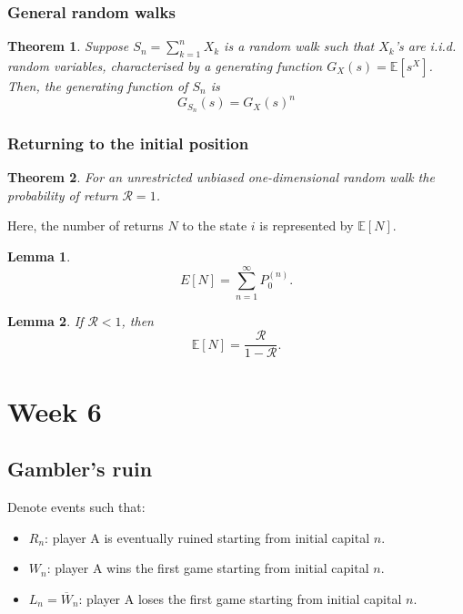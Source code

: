 \documentclass{article}
\newtheorem{theorem}{Theorem}
\newtheorem{lemma}{Lemma}
\newcommand{\E}{\mathbb{E}}
\newcommand{\MR}{\mathcal{R}}
\begin{document}
\subsubsection{General random walks}
\begin{theorem}
    Suppose $S_n = \sum_{k=1}^n X_k$ is a random walk such that $X_k$'s are i.i.d. random variables, characterised by a generating function $G_X(s)=\E[s^X]$. Then, the generating function of $S_n$ is
    \begin{equation}
        G_{S_n}(s)=G_X(s)^n
    \end{equation}
\end{theorem}
\subsubsection{Returning to the initial position}
\begin{theorem}
    For an unrestricted unbiased one-dimensional random walk the probability of return $\MR=1$.
\end{theorem}
Here, the number of returns $N$ to the state $i$ is represented by $\E[N]$.
\begin{lemma}
    \begin{equation}
        E[N]=\sum_{n=1}^\infty P_0^{(n)}.
    \end{equation}
\end{lemma}
\begin{lemma}
    If $\MR<1$, then
    \begin{equation}
        \E[N]=\frac{\MR}{1-\MR}.
    \end{equation}
\end{lemma}

\section{Week 6}
\subsection{Gambler's ruin}
Denote events such that:
\begin{itemize}
    \item $R_n$: player A is eventually ruined starting from initial capital $n$.
    \item $W_n$: player A wins the first game starting from initial capital $n$.
    \item $L_n=\overline{W}_n$: player A loses the first game starting from initial capital $n$.
\end{itemize}
\end{document}
